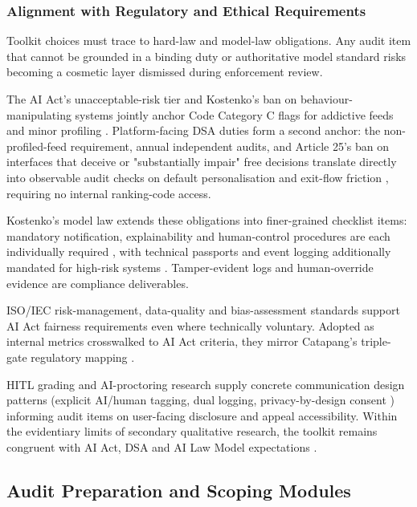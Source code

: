 \documentclass[11pt]{article}
\begin{document}
\subsubsection{Alignment with Regulatory and Ethical Requirements}
\label{sec:alignment_regulatory_ethical} Toolkit choices must trace to hard-law and model-law obligations. Any audit item that cannot be grounded in a binding duty or authoritative model standard risks becoming a cosmetic layer dismissed during enforcement review.

The AI Act's unacceptable-risk tier and Kostenko's ban on behaviour-manipulating systems jointly anchor Code Category C flags for addictive feeds and minor profiling \parencites[2248]{6502223}[10]{2977039}[61--62]{2977039}. Platform-facing DSA duties form a second anchor: the non-profiled-feed requirement, annual independent audits, and Article 25's ban on interfaces that deceive or "substantially impair" free decisions translate directly into observable audit checks on default personalisation and exit-flow friction \parencites[2248]{6502223}[20]{6941611}[6]{6295677}, requiring no internal ranking-code access.

Kostenko's model law extends these obligations into finer-grained checklist items: mandatory notification, explainability and human-control procedures are each individually required \parencites[8]{2977039}, with technical passports and event logging additionally mandated for high-risk systems \parencites[9]{2977039}[19.5]{2977039}. Tamper-evident logs and human-override evidence are compliance deliverables.

ISO/IEC risk-management, data-quality and bias-assessment standards \parencites[4]{8589961} support AI Act fairness requirements even where technically voluntary. Adopted as internal metrics crosswalked to AI Act criteria, they mirror Catapang's triple-gate regulatory mapping \parencites[23]{8367105}.

HITL grading and AI-proctoring research supply concrete communication design patterns (explicit AI/human tagging, dual logging, privacy-by-design consent \parencites{6805789}[20]{6805789}[9]{2055956}) informing audit items on user-facing disclosure and appeal accessibility. Within the evidentiary limits of secondary qualitative research, the toolkit remains congruent with AI Act, DSA and AI Law Model expectations \parencites[2248]{6502223}[20]{6941611}[8]{2977039}[9]{2055956}.

\subsection{Audit Preparation and Scoping Modules}
\end{document}
